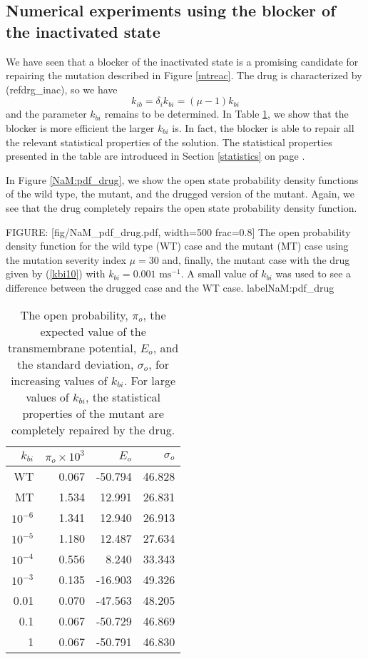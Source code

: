 \subsection{Numerical experiments using the blocker of the inactivated state}

We have seen that a blocker of the inactivated state is a promising
candidate for repairing the mutation described in Figure \ref{mtreac}. The drug
is characterized by (ref{drg_inac}), so we have
\begin{equation}
k_{ib}=\delta_{i}k_{bi}=\left(  \mu-1\right)  k_{bi} \label{kbi10}
\end{equation}
and the parameter $k_{bi}$ remains to be determined. In Table \ref{kbi_stat}, we show that the
blocker is more efficient the larger $k_{bi}$ is. In fact, the blocker is able to
repair all the relevant statistical properties of the solution. The statistical properties
presented in the table are introduced in Section \ref{statistics} on page \pageref{statistics}.


In Figure \ref{NaM:pdf_drug}, we show the open state probability density functions of the
wild type, the mutant, and the drugged version of the mutant. Again, we see
that the drug completely repairs the open state probability density function.

FIGURE: [fig/NaM_pdf_drug.pdf, width=500 frac=0.8] The open probability density function for the wild type
(WT) case and the mutant (MT) case using the mutation severity index $\mu=30$
and, finally, the mutant case with the drug given by (\ref{kbi10}) with 
$k_{bi} = 0.001\text{ ms}^{-1}$. A small value of $k_{bi}$ was used to
see a difference between the drugged case and the WT case. label{NaM:pdf_drug}\begin{table}  \begin{center}
\begin{tabular}{|r|r|r|r|} \hline
$k_{bi}$ & $\pi_o\times 10^3 $ & $E_o$ & $\sigma_o$ \\ \hline
WT & 0.067 & -50.794 & 46.828 \\ \hline
MT & 1.534 & 12.991 & 26.831 \\ \hline
$10^{-6}$ & 1.341 & 12.940 & 26.913 \\ \hline
$10^{-5}$ & 1.180 & 12.487 & 27.634 \\ \hline
$10^{-4}$ & 0.556 & 8.240 & 33.343 \\ \hline
$10^{-3}$ & 0.135 & -16.903 & 49.326 \\ \hline
0.01 & 0.070 & -47.563 & 48.205 \\ \hline
0.1 & 0.067 & -50.729 & 46.869 \\ \hline
1 & 0.067 & -50.791 & 46.830 \\ \hline
\end{tabular} \end{center}
\caption{The open probability, $\pi_o$, the expected value of the transmembrane potential, $E_o$, and the
standard deviation, $\sigma_o$, for increasing values of $k_{bi}$. For large values of $k_{bi}$, the statistical properties 
of the mutant are completely repaired by the drug. 
}
\label{kbi_stat}
\end{table}

